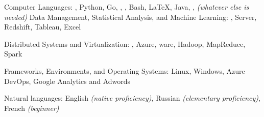 \documentclass[10pt,letterpaper]{article} %
\begin{document}
\spacedhrule{0.5em}{-0.4em}



\inlineheadsection
    {Computer Languages:}
    {, Python, Go, , , Bash, \LaTeX,
      Java, , \textit{(whatever else is needed)}
    }
    \inlineheadsection
        {Data Management, Statistical Analysis, and Machine Learning:}
        {,  Server, Redshift, Tableau, Excel}

    \inlineheadsection
        {Distributed Systems and Virtualization:}
        {, Azure, ware, Hadoop, MapReduce, Spark}

    \inlineheadsection
        {Frameworks, Environments, and Operating Systems:}
        {Linux, Windows, Azure DevOps, Google Analytics and Adwords}

    \inlineheadsection
        {Natural languages:}
        {English \textit{(native proficiency)}, Russian
          \textit{(elementary proficiency)}, French \textit{(beginner)}}

\spacedhrule{2.0em}{-0.4em}






\end{document}
